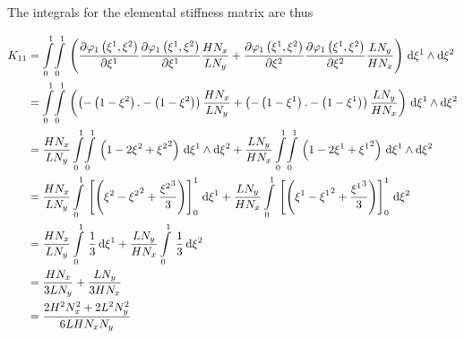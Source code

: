 The integrals for the elemental stiffness matrix are thus

\begin{equation}
  \begin{aligned}
    K_{11}&=\giint{0}{1}{0}{1}{\pbrac{\delby{\lbfn{1}{\xione,\xitwo}}{\xione}\delby{\lbfn{1}{\xione,\xitwo}}{\xione}
        \dfrac{H N_{x}}{L N_{y}}+\delby{\lbfn{1}{\xione,\xitwo}}{\xitwo}\delby{\lbfn{1}{\xione,\xitwo}}{\xitwo}
        \dfrac{L N_{y}}{H N_{x}}}}{\xione}{\xitwo}\\
    &=\giint{0}{1}{0}{1}{\pbrac{\pbrac{-\pbrac{1-\xitwo}.-\pbrac{1-\xitwo}}\dfrac{H N_{x}}{L N_{y}}+
    \pbrac{-\pbrac{1-\xione}.-\pbrac{1-\xione}}\dfrac{L N_{y}}{H N_{x}}}}{\xione}{\xitwo} \\
    &=\dfrac{H N_{x}}{L N_{y}}\giint{0}{1}{0}{1}{\pbrac{1-2\xitwo+\xitwosq}}{\xione}{\xitwo}+
    \dfrac{L N_{y}}{H N_{x}}\giint{0}{1}{0}{1}{\pbrac{1-2\xione+\xionesq}}{\xione}{\xitwo} \\
    &=\dfrac{H N_{x}}{L N_{y}}\gint{0}{1}{\sqbrac{\pbrac{\xitwo-\xitwosq+\dfrac{\xitwocube}{3}}}_{0}^{1}}{\xione}+
    \dfrac{L N_{y}}{H N_{x}}\gint{0}{1}{\sqbrac{\pbrac{\xione-\xionesq+\dfrac{\xionecube}{3}}}_{0}^{1}}{\xitwo} \\
    &=\dfrac{H N_{x}}{L N_{y}}\gint{0}{1}{\dfrac{1}{3}}{\xione}+\dfrac{L N_{y}}{H N_{x}}\gint{0}{1}{\dfrac{1}{3}}{\xitwo} \\
    &=\dfrac{H N_{x}}{3 L N_{y}}+\dfrac{L N_{y}}{3 H N_{x}} \\
    &=\dfrac{2 H^{2}N_{x}^{2}+2 L^{2}N_{y}^{2}}{6 L H N_{x} N_{y}}
  \end{aligned}
\end{equation}

